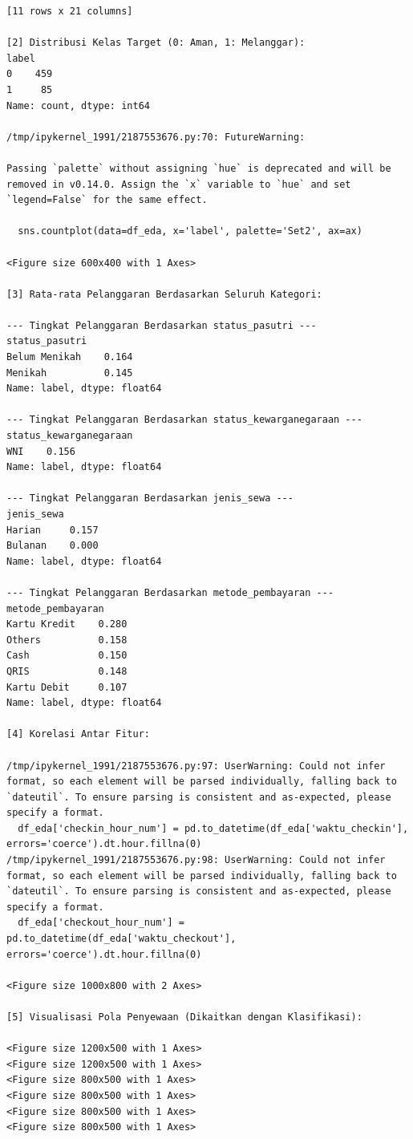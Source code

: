 \begin{lstlisting}[caption={Output 17}]
[11 rows x 21 columns]

[2] Distribusi Kelas Target (0: Aman, 1: Melanggar):
label
0    459
1     85
Name: count, dtype: int64

/tmp/ipykernel_1991/2187553676.py:70: FutureWarning: 

Passing `palette` without assigning `hue` is deprecated and will be removed in v0.14.0. Assign the `x` variable to `hue` and set `legend=False` for the same effect.

  sns.countplot(data=df_eda, x='label', palette='Set2', ax=ax)

<Figure size 600x400 with 1 Axes>

[3] Rata-rata Pelanggaran Berdasarkan Seluruh Kategori:

--- Tingkat Pelanggaran Berdasarkan status_pasutri ---
status_pasutri
Belum Menikah    0.164
Menikah          0.145
Name: label, dtype: float64

--- Tingkat Pelanggaran Berdasarkan status_kewarganegaraan ---
status_kewarganegaraan
WNI    0.156
Name: label, dtype: float64

--- Tingkat Pelanggaran Berdasarkan jenis_sewa ---
jenis_sewa
Harian     0.157
Bulanan    0.000
Name: label, dtype: float64

--- Tingkat Pelanggaran Berdasarkan metode_pembayaran ---
metode_pembayaran
Kartu Kredit    0.280
Others          0.158
Cash            0.150
QRIS            0.148
Kartu Debit     0.107
Name: label, dtype: float64

[4] Korelasi Antar Fitur:

/tmp/ipykernel_1991/2187553676.py:97: UserWarning: Could not infer format, so each element will be parsed individually, falling back to `dateutil`. To ensure parsing is consistent and as-expected, please specify a format.
  df_eda['checkin_hour_num'] = pd.to_datetime(df_eda['waktu_checkin'], errors='coerce').dt.hour.fillna(0)
/tmp/ipykernel_1991/2187553676.py:98: UserWarning: Could not infer format, so each element will be parsed individually, falling back to `dateutil`. To ensure parsing is consistent and as-expected, please specify a format.
  df_eda['checkout_hour_num'] = pd.to_datetime(df_eda['waktu_checkout'], errors='coerce').dt.hour.fillna(0)

<Figure size 1000x800 with 2 Axes>

[5] Visualisasi Pola Penyewaan (Dikaitkan dengan Klasifikasi):

<Figure size 1200x500 with 1 Axes>
<Figure size 1200x500 with 1 Axes>
<Figure size 800x500 with 1 Axes>
<Figure size 800x500 with 1 Axes>
<Figure size 800x500 with 1 Axes>
<Figure size 800x500 with 1 Axes>


\end{lstlisting}
